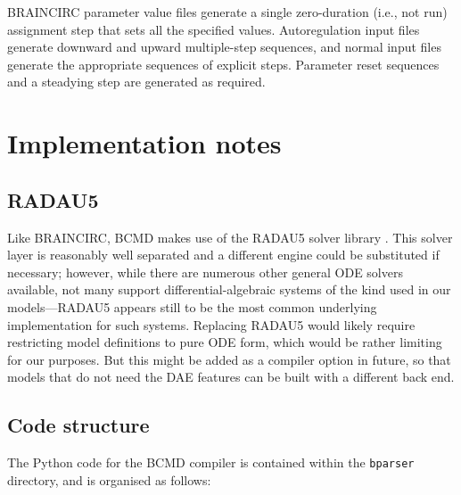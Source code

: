 \documentclass[a4paper,11pt]{article}
\begin{document}
BRAINCIRC parameter value files generate a single zero-duration (i.e., not run) assignment step that sets all the specified values. Autoregulation input files generate downward and upward multiple-step sequences, and normal input files generate the appropriate sequences of explicit steps. Parameter reset sequences and a steadying step are generated as required.

\section{Implementation notes}\label{impl}

\subsection{RADAU5}\label{radau}

Like BRAINCIRC, BCMD makes use of the RADAU5 solver library \citep{Hairer:1996ub}. This solver layer is reasonably well separated and a different engine could be substituted if necessary; however, while there are numerous other general ODE solvers available, not many support differ\-ential-algebraic systems of the kind used in our models---RADAU5 appears still to be the most common underlying implementation for such systems. Replacing RADAU5 would  likely require restricting model definitions to pure ODE form, which would be rather limiting for our purposes. But this might be added as a compiler option in future, so that models that do not need the DAE features can be built with a different back end.

\subsection{Code structure}\label{struct}

The Python code for the BCMD compiler is contained within the \texttt{bparser} directory, and is organised as follows:
\end{document}
